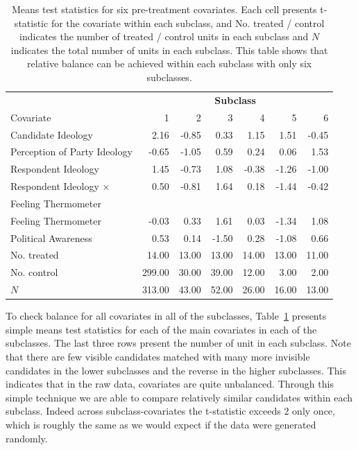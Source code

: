 \documentclass[11pt,titlepage]{article}
\newcommand{\MC}{\multicolumn}
\begin{document}
\begin{table}[t]
  \begin{center}
    \begin{tabular}{lrrrrrr}
      \hline
      & \MC{6}{c}{\bf Subclass} \\
      Covariate &  1 &  2 &  3 &  4 &  5 &  6 \\
      \hline
      Candidate Ideology & 2.16 & -0.85 & 0.33 & 1.15 & 1.51 & -0.45 \\
      Perception of Party Ideology & -0.65 & -1.05 & 0.59 & 0.24 & 0.06 & 1.53 \\
      Respondent Ideology & 1.45 & -0.73 & 1.08 & -0.38 & -1.26 & -1.00 \\
      Respondent Ideology $\times$ & 0.50 & -0.81 & 1.64 & 0.18 &
      -1.44 & -0.42 \\
      \hspace{0.1in} Feeling Thermometer \\
      Feeling Thermometer & -0.03 & 0.33 & 1.61 & 0.03 & -1.34 & 1.08 \\
      Political Awareness & 0.53 & 0.14 & -1.50 & 0.28 & -1.08 & 0.66 \\
      No. treated & 14.00 & 13.00 & 13.00 & 14.00 & 13.00 & 11.00 \\
      No. control & 299.00 & 30.00 & 39.00 & 12.00 & 3.00 & 2.00 \\
      $N$ & 313.00 & 43.00 & 52.00 & 26.00 & 16.00 & 13.00 \\
      \hline
    \end{tabular}
    \caption{Means test statistics for six pre-treatment covariates.
      Each cell presents t-statistic for the covariate within each
      subclass, and No. treated / control indicates the number of
      treated / control units in each subclass and $N$ indicates the total
      number of units in each subclass.  This table shows that
      relative balance can be achieved within each subclass with only
      six subclasses.}
    \label{tb:kochxsub}
  \end{center}
\end{table}

To check balance for all covariates in all of the subclasses,
Table~\ref{tb:kochxsub} presents simple means test statistics for each
of the main covariates in each of the subclasses.  The last three rows
present the number of unit in each subclass.  Note that there are few
visible candidates matched with many more invisible candidates in the
lower subclasses and the reverse in the higher subclasses.  This
indicates that in the raw data, covariates are quite unbalanced.
Through this simple technique we are able to compare relatively
similar candidates within each subclass.  Indeed across
subclass-covariates the t-statistic exceeds 2 only once, which is
roughly the same as we would expect if the data were generated
randomly.
\end{document}
